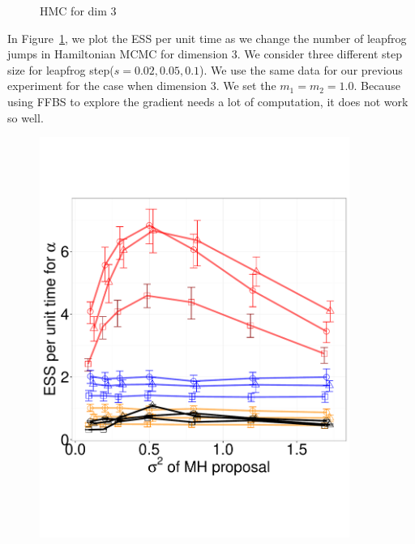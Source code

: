 \begin{figure}[H]
\begin{minipage}[hp]{0.45\linewidth}
      \end{minipage}
    \caption{HMC for dim 3}
    \label{fig:HMC_DIM_3}
  \end{figure}
In Figure~\ref{fig:HMC_DIM_3}, we plot the ESS per unit time as we change the 
number of leapfrog jumps in Hamiltonian MCMC for dimension $3$. We consider 
three different step size for leapfrog step($s = 0.02, 0.05, 0.1$). We 
use the same data for our previous experiment for the case when dimension $3$. 
We set the $m_1 = m_2 = 1.0$. Because using FFBS to explore the gradient needs 
a lot of computation, it does not work so well.\\

  \begin{figure}[H]
  \centering
  \begin{minipage}[!hp]{0.45\linewidth}
  \centering
    \includegraphics [width=0.90\textwidth, angle=0]{figs/exp_5_alpha.pdf}
      \end{minipage}
  \begin{minipage}[hp]{0.45\linewidth}
  \centering

\end{minipage}
\end{figure}
